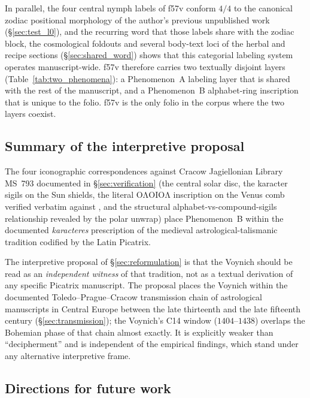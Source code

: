 In parallel, the four central nymph labels of f57v conform $4/4$ to
the canonical zodiac positional morphology of the author's previous
unpublished work (\S\ref{sec:test_l0}), and the recurring word that
those labels share with the zodiac block, the cosmological foldouts
and several body-text loci of the herbal and recipe sections
(\S\ref{sec:shared_word}) shows that this categorial labeling system
operates manuscript-wide. f57v therefore carries two textually
disjoint layers (Table~\ref{tab:two_phenomena}): a Phenomenon~A
labeling layer that is shared with the rest of the manuscript, and a
Phenomenon~B alphabet-ring inscription that is unique to the folio.
f57v is the only folio in the corpus where the two layers coexist.

\subsection{Summary of the interpretive proposal}
\label{sec:summary_interpretive}

The four iconographic correspondences against Cracow Jagiellonian
Library MS~793 documented in \S\ref{sec:verification} (the central
solar disc, the karacter sigils on the Sun shields, the literal
$\mathrm{O\Lambda OIO\Lambda}$ inscription on the Venus comb verified
verbatim against \citet{pingree1986}, and the structural
alphabet-vs-compound-sigils relationship revealed by the polar
unwrap) place Phenomenon~B within the documented \textit{karacteres}
prescription of the medieval astrological-talismanic tradition
codified by the Latin Picatrix.

The interpretive proposal of \S\ref{sec:reformulation} is that the
Voynich should be read as an \emph{independent witness} of that
tradition, not as a textual derivation of any specific Picatrix
manuscript. The proposal places the Voynich within the documented
Toledo--Prague--Cracow transmission chain of astrological manuscripts
in Central Europe between the late thirteenth and the late fifteenth
century (\S\ref{sec:transmission}); the Voynich's C14 window
($1404$--$1438$) overlaps the Bohemian phase of that chain almost
exactly. It is explicitly weaker than ``decipherment'' and is
independent of the empirical findings, which stand under any
alternative interpretive frame.

\subsection{Directions for future work}
\label{sec:future_work}

